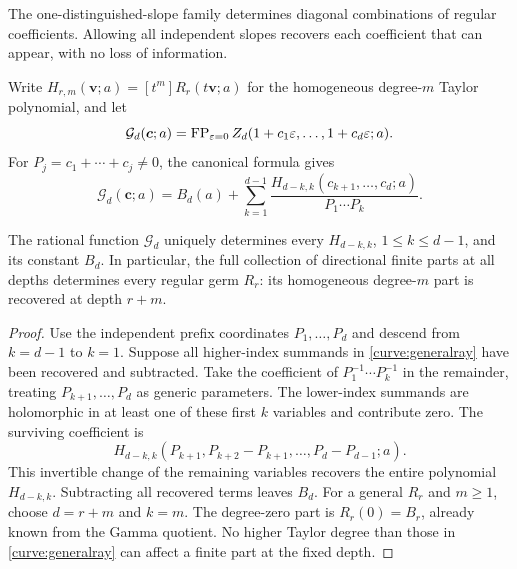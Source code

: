The one-distinguished-slope family determines diagonal combinations
of regular coefficients. Allowing all independent slopes recovers
each coefficient that can appear, with no loss of information.

Write $H_{r,m}(\boldsymbol v;a)=[t^m]R_r(t\boldsymbol v;a)$ for the
homogeneous degree-$m$ Taylor polynomial, and let
\[
 \mathcal G_d(\boldsymbol c;a)=\operatorname{FP}_{\varepsilon=0}
 Z_d(1+c_1\varepsilon,\ldots,1+c_d\varepsilon;a).
\]
For $P_j=c_1+\cdots+c_j\ne0$, the canonical formula gives
\begin{equation}\label{curve:generalray}
 \mathcal G_d(\boldsymbol c;a)=B_d(a)+
 \sum_{k=1}^{d-1}
 \frac{H_{d-k,k}(c_{k+1},\ldots,c_d;a)}{P_1\cdots P_k}.
\end{equation}

\begin{corollary}
\label{curve:reconstruction}
The rational function $\mathcal G_d$ uniquely determines every
$H_{d-k,k}$, $1\le k\le d-1$, and its constant $B_d$. In particular,
the full collection of directional finite parts at all depths
determines every regular germ $R_r$: its homogeneous degree-$m$ part
is recovered at depth $r+m$.
\end{corollary}

\begin{proof}
Use the independent prefix coordinates $P_1,\ldots,P_d$ and descend
from $k=d-1$ to $k=1$. Suppose all higher-index summands in
\eqref{curve:generalray} have been recovered and subtracted. Take the
coefficient of $P_1^{-1}\cdots P_k^{-1}$ in the remainder, treating
$P_{k+1},\ldots,P_d$ as generic parameters. The lower-index summands
are holomorphic in at least one of these first $k$ variables and
contribute zero. The surviving coefficient is
\[
 H_{d-k,k}(P_{k+1},P_{k+2}-P_{k+1},\ldots,P_d-P_{d-1};a).
\]
This invertible change of the remaining variables recovers the
entire polynomial $H_{d-k,k}$. Subtracting all recovered terms leaves
$B_d$. For a general $R_r$ and $m\ge1$, choose $d=r+m$ and $k=m$.
The degree-zero part is $R_r(0)=B_r$, already known from the Gamma
quotient. No higher Taylor degree than those in
\eqref{curve:generalray} can affect a finite part at the fixed depth.
\end{proof}
